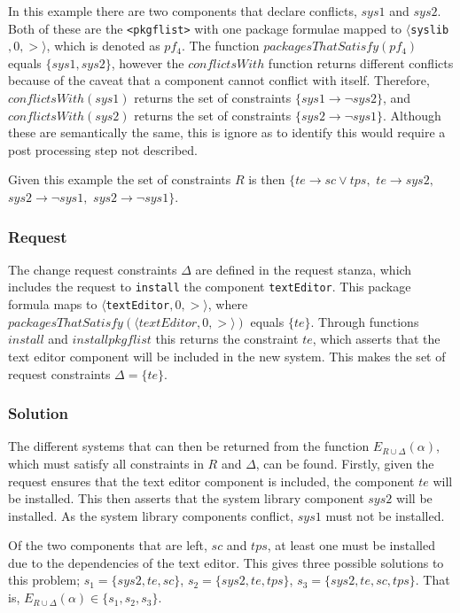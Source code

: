 In this example there are two components that declare conflicts, $sys1$ and $sys2$.
Both of these are the \verb+<pkgflist>+ with one package formulae mapped to  $\langle $\verb+syslib+$,0,>\rangle$, which is denoted as $pf_4$.
The function $packagesThatSatisfy(pf_4)$ equals $\{ sys1,sys2 \}$,
however the $conflictsWith$ function returns different conflicts because of the caveat that a component cannot conflict with itself.
Therefore, $conflictsWith(sys1)$ returns the set of constraints $\{sys1 \rightarrow \neg sys2\}$,
and $conflictsWith(sys2)$ returns the set of constraints $\{sys2 \rightarrow \neg sys1\}$.
Although these are semantically the same, this is ignore as to identify this would require a post processing step not described.

Given this example the set of constraints $R$ is then 
$\{ te \rightarrow sc \vee tps,$ 
$te \rightarrow sys2,$ 
$sys2 \rightarrow \neg sys1,$   
$sys2 \rightarrow \neg sys1\}$.

\subsubsection{Request}
The change request constraints $\Delta$ are defined in the request stanza, which includes the request to \verb+install+ the component \verb+textEditor+. 
This package formula maps to $\langle $\verb+textEditor+$,0,>\rangle$, where $packagesThatSatisfy(\langle textEditor,0,>\rangle)$ equals $\{te\}$.
Through functions $install$ and $installpkgflist$ this returns the constraint $te$,
which asserts that the text editor component will be included in the new system.
This makes the set of request constraints $\Delta = \{te\}$.

\subsubsection{Solution}
The different systems that can then be returned from the function $E_{R \cup \Delta}(\alpha)$, which must satisfy all constraints in $R$ and $\Delta$, can be found.
Firstly, given the request ensures that the text editor component is included, the component $te$ will be installed.
This then asserts that the system library component $sys2$ will be installed.
As the system library components conflict, $sys1$ must not be installed.

Of the two components that are left, $sc$ and $tps$, at least one must be installed due to the dependencies of the text editor.
This gives three possible solutions to this problem;
$s_1 = \{sys2, te, sc\}$,
$s_2 = \{sys2, te, tps\}$,
$s_3 = \{sys2, te, sc, tps\}$.
That is, $E_{R \cup \Delta}(\alpha) \in \{s_1,s_2,s_3\}$.

